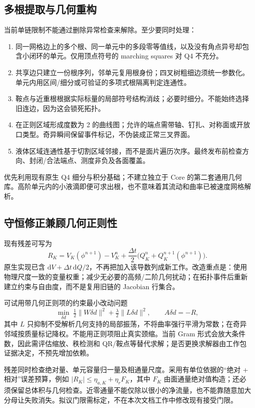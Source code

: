 \documentclass[11pt,a4paper]{article}
\newcommand{\dd}{\mathrm{d}}
\begin{document}
\subsection{多根提取与几何重构}
当前单链限制不能通过删除异常检查来解除。至少要同时处理：
\begin{enumerate}
\item 同一网格边上的多个根、同一单元中的多段零等值线，以及没有角点异号却包含小闭环的单元。仅用顶点符号的 marching squares 对 Q4 不充分。
\item 共享边只建立一份根序列，邻单元复用根身份；四叉树粗细边须统一参数化。单元内用区间/细分或可验证的多项式根隔离判定连通性。
\item 鞍点与近重根根据实际标量的局部符号结构消歧；必要时细分。不能始终选择旧连边，因为这会锁死拓扑。
\item 在正则区域形成度数为 2 的曲线图；允许的端点需带轴、钉扎、对称面或开放口类型。奇异瞬间保留事件标记，不伪装成正常三叉界面。
\item 液体区域连通性基于切割区域邻接，而不是面片遍历次序。最终发布前检查方向、封闭/合法端点、测度非负及各面覆盖。
\end{enumerate}
优先利用现有原生 Q4 细分与积分基础；不建立独立于 Core 的第二套通用几何库。高阶单元内的小液滴即便可求出根，也不意味着其流动和曲率已被速度网格解析。

\subsection{守恒修正兼顾几何正则性}
现有残差可写为
\begin{equation}
R_K=V_K(\phi^{n+1})-V_K^n+\frac{\Delta t}{2}
\bigl(Q_K^n+Q_K^{n+1}(\phi^{n+1})\bigr).
\end{equation}
原生实现已含 $\dd V+\Delta t\,\dd Q/2$，不再把加入该导数列成新工作。改造重点是：使用物理尺度一致的变量权重；减少无必要的高频/二阶几何扰动；在拓扑事件后重新建立约束与自由度，而不是复用旧链的 Jacobian 行集合。

可试用带几何正则项的约束最小改动问题
\begin{equation}
\min_{\delta d}\;\tfrac12\|W\delta d\|^2+
\tfrac\lambda2\|L\delta d\|^2,
\qquad A\delta d=-R,
\end{equation}
其中 $L$ 只抑制不受解析几何支持的局部振荡，不将曲率强行平滑为常数；在奇异邻域按质量标记降权。不能用正则项阻止真实颈缩。当前 Gram 形式会放大条件数，因此需评估缩放、秩检测和 QR/鞍点等替代求解；是否更换求解器由工作包证据决定，不预先增加依赖。

残差同时检查绝对量、单元容量归一量及相通量尺度。采用有单位依据的“绝对 + 相对”误差预算，例如 $|R_K|\leq\eta_{a,K}+\eta_r F_K$，其中 $F_K$ 由面通量绝对值构造；还必须保留总体积与几何检查。近零通量不能仅除以很小的净流量，也不能靠随意加大分母让失败消失。拟议门限需标定，不在本次文档工作中修改现有接受门限。
\end{document}
